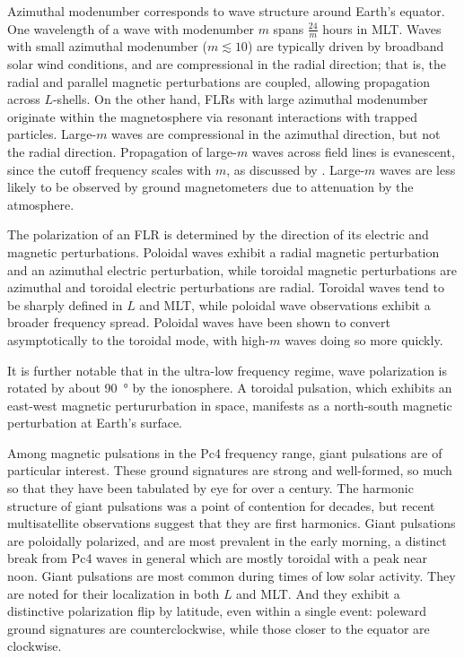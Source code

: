 \documentclass[draft,linenumbers]{agujournal}
\begin{document}
Azimuthal modenumber corresponds to wave structure around Earth's equator. One wavelength of a wave with modenumber $m$ spans $\frac{24}{m}$ hours in MLT. Waves with small azimuthal modenumber ($m \lesssim 10$) are typically driven by broadband solar wind conditions\citep{degeling_2014,hao_2014,zong_2009,chen_1974,liu_2011,southwood_1974}, and are compressional in the radial direction; that is, the radial and parallel magnetic perturbations are coupled, allowing propagation across $L$-shells. On the other hand, FLRs with large azimuthal modenumber originate within the magnetosphere via resonant interactions with trapped particles. Large-$m$ waves are compressional in the azimuthal direction, but not the radial direction. Propagation of large-$m$ waves across field lines is evanescent\citep{cummings_1969,radoski_1974}, since the cutoff frequency scales with $m$, as discussed by \citet{lee_1990}. Large-$m$ waves are less likely to be observed by ground magnetometers due to attenuation by the atmosphere\citep{hughes_1976,wright_1999,yeoman_2001}.

The polarization of an FLR is determined by the direction of its electric and magnetic perturbations. Poloidal waves exhibit a radial magnetic perturbation and an azimuthal electric perturbation, while toroidal magnetic perturbations are azimuthal and toroidal electric perturbations are radial. Toroidal waves tend to be sharply defined in $L$ and MLT, while poloidal wave observations exhibit a broader frequency spread\citep{engebretson_1986}. Poloidal waves have been shown to convert asymptotically to the toroidal mode, with high-$m$ waves doing so more quickly\citep{mann_1995,mann_1997,radoski_1974}.

It is further notable that in the ultra-low frequency regime, wave polarization is rotated by about \SI{90}{\degree} by the ionosphere\citep{nishida_1964_screening}. A toroidal pulsation, which exhibits an east-west magnetic pertururbation in space, manifests as a north-south magnetic perturbation at Earth's surface.

Among magnetic pulsations in the Pc4 frequency range, giant pulsations are of particular interest. These ground signatures are strong and well-formed, so much so that they have been tabulated by eye for over a century\citep{birkeland_1901}. The harmonic structure of giant pulsations was a point of contention for decades, but recent multisatellite observations suggest that they are first harmonics\citep{glassmeier_1999,hillebrand_1982,kokubun_1989,takahashi_2011}. Giant pulsations are poloidally polarized, and are most prevalent in the early morning\citep{chisham_1991,glassmeier_1980,rostoker_1979}, a distinct break from Pc4 waves in general which are mostly toroidal with a peak near noon\citep{anderson_1990}. Giant pulsations are most common during times of low solar activity\citep{brekke_1987}. They are noted for their localization in both $L$ and MLT\citep{anderson_1990}. And they exhibit a distinctive polarization flip by latitude, even within a single event: poleward ground signatures are counterclockwise, while those closer to the equator are clockwise\citep{eleman_1967}.
\end{document}
